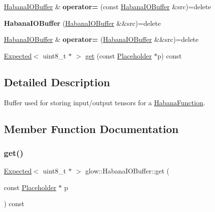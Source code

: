 \begin{DoxyCompactItemize}
\mbox{\label{classglow_1_1_habana_i_o_buffer_a1cd6ce6cb2f7e50a224fca07be2e7d9c}} 
\hyperlink{classglow_1_1_habana_i_o_buffer}{Habana\+I\+O\+Buffer} \& {\bfseries operator=} (const \hyperlink{classglow_1_1_habana_i_o_buffer}{Habana\+I\+O\+Buffer} \&src)=delete
\item 
\mbox{\label{classglow_1_1_habana_i_o_buffer_a67803be066dc3804ed2f3bd9630cb2e7}} 
{\bfseries Habana\+I\+O\+Buffer} (\hyperlink{classglow_1_1_habana_i_o_buffer}{Habana\+I\+O\+Buffer} \&\&src)=delete
\item 
\mbox{\label{classglow_1_1_habana_i_o_buffer_a823ba4535accc6dfbaac5fb33360b477}} 
\hyperlink{classglow_1_1_habana_i_o_buffer}{Habana\+I\+O\+Buffer} \& {\bfseries operator=} (\hyperlink{classglow_1_1_habana_i_o_buffer}{Habana\+I\+O\+Buffer} \&\&src)=delete
\item 
\hyperlink{classglow_1_1detail_1_1_glow_expected}{Expected}$<$ uint8\+\_\+t $\ast$ $>$ \hyperlink{classglow_1_1_habana_i_o_buffer_a5c879da6fe9a4ca093f29865cf4dfaad}{get} (const \hyperlink{classglow_1_1_placeholder}{Placeholder} $\ast$p) const
\end{DoxyCompactItemize}


\subsection{Detailed Description}
Buffer used for storing input/output tensors for a \hyperlink{classglow_1_1_habana_function}{Habana\+Function}. 

\subsection{Member Function Documentation}
\mbox{\label{classglow_1_1_habana_i_o_buffer_a5c879da6fe9a4ca093f29865cf4dfaad}} 
\subsubsection{\texorpdfstring{get()}{get()}}
{\footnotesize\ttfamily \hyperlink{classglow_1_1detail_1_1_glow_expected}{Expected}$<$ uint8\+\_\+t $\ast$ $>$ glow\+::\+Habana\+I\+O\+Buffer\+::get (\begin{DoxyParamCaption}\item[{const \hyperlink{classglow_1_1_placeholder}{Placeholder} $\ast$}]{p }\end{DoxyParamCaption}) const}

